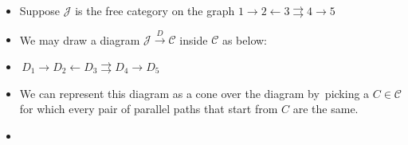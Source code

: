 
\begin{itemize}
    \item Suppose $\mathcal{J}$ is the free category on the graph $\boxed{1 \rightarrow 2 \leftarrow 3 \rightrightarrows 4 \rightarrow 5}$
    \item We may draw a diagram $\mathcal{J}\xrightarrow{D}\mathcal{C}$ inside $\mathcal{C}$ as below:
    \item \,$\boxed{D_1 \rightarrow D_2 \leftarrow D_3 \rightrightarrows D_4 \rightarrow D_5}$\,
    \item We can represent this diagram as a cone over the diagram by \,picking a $C \in \mathcal{C}$ for which every pair of parallel paths that start from $C$ are the same.
    \item {}\,
  \end{itemize}
